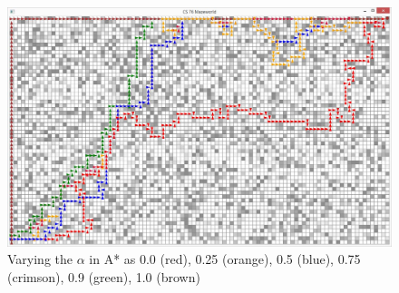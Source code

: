 \begin{figure}[!h]
\centering
\includegraphics[width=1\textwidth]{s-2-1.JPG}
\caption{Varying the $\alpha$ in A* as 0.0 (red), 0.25 (orange), 0.5 (blue), 0.75 (crimson), 0.9 (green), 1.0 (brown)}
\label{s-2}
\end{figure}